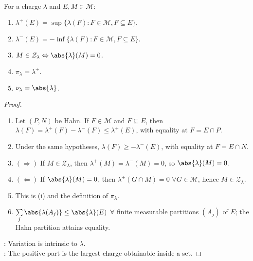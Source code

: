 \begin{corollary} \label{cor:variation-supremum-formulas-and-null-sets} \\
For a charge $\lambda$ and $E,M\in\mathcal{M}$:
\begin{enumerate}[label=(\roman*)]
\setlength{\itemsep}{0pt}
\item $\lambda^+(E)=\sup\{\lambda(F):F\in\mathcal{M},F\subseteq E\}$.
\item $\lambda^-(E)=-\inf\{\lambda(F):F\in\mathcal{M},F\subseteq E\}$.
\item $M\in\mathcal{Z}_\lambda\Leftrightarrow\abs{\lambda}(M)=0$.
\item $\pi_\lambda=\lambda^+$.
\item $\nu_\lambda=\abs{\lambda}$.
\end{enumerate}
\begin{proof}
\begin{enumerate}[label=(\roman*)]
\setlength{\itemsep}{0pt}
\item[$(i)$] Let $(P,N)$ be Hahn. If $F\in\mathcal{M}$ and $F\subseteq E$, then $\lambda(F)=\lambda^+(F)-\lambda^-(F)\leq\lambda^+(E)$, with equality at $F=E\cap P$.
\item[$(ii)$] Under the same hypotheses, $\lambda(F)\geq-\lambda^-(E)$, with equality at $F=E\cap N$.
\item[$(iii)$]$(\Rightarrow)$ If $M\in\mathcal{Z}_\lambda$, then $\lambda^+(M)=\lambda^-(M)=0$, so $\abs{\lambda}(M)=0$.\\
\item[$(iii)$]$(\Leftarrow)$ If $\abs{\lambda}(M)=0$, then $\lambda^\pm(G\cap M)=0$ $\forall G\in\mathcal{M}$, hence $M\in\mathcal{Z}_\lambda$.
\item[$(iv)$] This is (i) and the definition of $\pi_\lambda$.
\item[$(v)$] $\sum\limits_j\abs{\lambda(A_j)}\leq\abs{\lambda}(E)$ $\forall$ finite measurable partitions $(A_j)$ of $E$; the Hahn partition attains equality.
\end{enumerate}
: Variation is intrinsic to $\lambda$.\\
: The positive part is the largest charge obtainable inside a set.
\end{proof}
\end{corollary}

